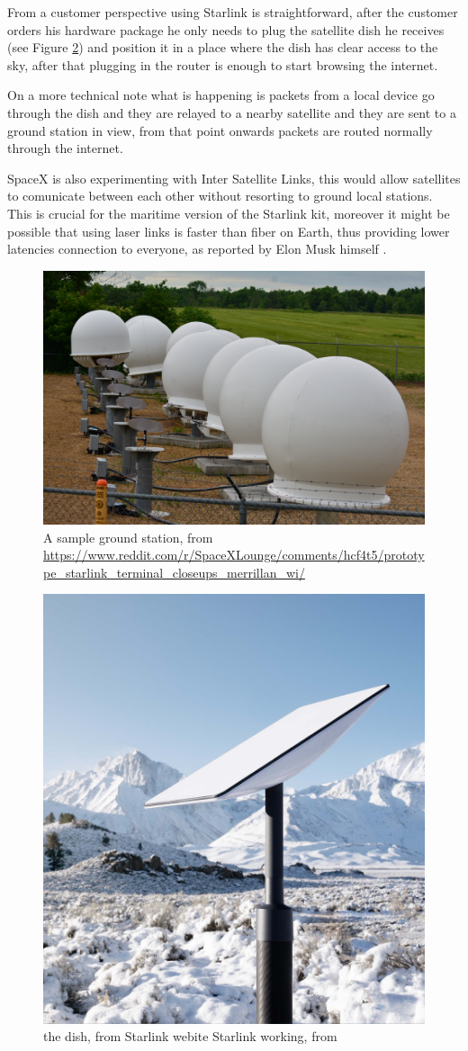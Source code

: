 \documentclass[IN,11pt,twoside,openright,bachelor,english]{tumthesis}
\begin{document}
From a customer perspective using Starlink is straightforward, after the customer orders his hardware package he only needs to plug the satellite dish he receives (see Figure \ref{fig:dish}) and position it in a place where the dish has clear access to the sky, after that plugging in the router is enough to start browsing the internet.

On a more technical note what is happening is packets from a local device go through the dish and they are relayed to a nearby satellite and they are sent to a ground station in view, from that point onwards packets are routed normally through the internet.

SpaceX is also experimenting with Inter Satellite Links, this would allow satellites to comunicate between each other without resorting to ground local stations. This is crucial for the maritime version of the Starlink kit, moreover it might be possible that using laser links is faster than fiber on Earth, thus providing lower latencies connection to everyone, as reported by Elon Musk himself \cite{tweet}.

\begin{figure}
	\centering
	\includegraphics[width=0.6\columnwidth]{img/ground-station.jpeg}
	\caption{A sample ground station, from \url{https://www.reddit.com/r/SpaceXLounge/comments/hcf4t5/prototype_starlink_terminal_closeups_merrillan_wi/}}
	\label{fig:gs}
\end{figure}

\begin{figure}
	\centering
	\includegraphics[width=0.6\columnwidth]{img/dish.jpeg}
	\caption{the dish, from Starlink webite Starlink working, from \cite{izhikevich2023democratizing}}
	\label{fig:dish}
\end{figure}
\end{document}

